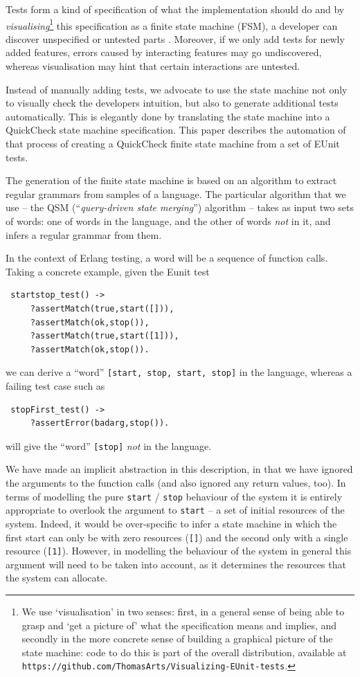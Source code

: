 \documentclass[]{sigplanconf}
\begin{document}
Tests form a kind of specification of what the implementation should do and by \emph{visualising}\footnote{We use `visualisation' in two senses: first, in a general sense of being able to grasp and `get a picture of' what the specification means and implies, and secondly in the more concrete sense of building a graphical picture of the state machine: code to do this is part of the overall distribution, available at \texttt{https://github.com/ThomasArts/Visualizing-EUnit-tests}.} this specification as a finite state machine (FSM), a developer can discover unspecified or untested parts \cite{arts2010test}. Moreover, if we only add tests for newly added features, errors caused by interacting features may go undiscovered, whereas visualisation may hint that certain interactions are untested. 

Instead of manually adding tests, we advocate to use the state machine not only to visually check the developers intuition, but also to generate additional tests automatically. This is elegantly done by translating the state machine into a QuickCheck state machine specification.
This paper describes the automation of that process of creating a QuickCheck finite state machine from a set of EUnit tests.  

The generation of the finite state machine is based on an algorithm to extract regular grammars from samples of a language. The particular algorithm that we use -- the QSM (``\emph{query-driven state merging}'') algorithm \cite{dupont2008qsm} --  takes as input two sets of words: one of words in the language, and the other of words \emph{not} in it, and infers a regular grammar from them. 

In the context of Erlang testing, a word will be a sequence of function calls. Taking a concrete example, given the Eunit test
\begin{verbatim}
 startstop_test() ->
     ?assertMatch(true,start([])),
     ?assertMatch(ok,stop()),
     ?assertMatch(true,start([1])),
     ?assertMatch(ok,stop()).
\end{verbatim}
we can derive a ``word'' \verb+[start, stop, start, stop]+ in the language, whereas a failing test case such as
\begin{verbatim}
 stopFirst_test() -> 
     ?assertError(badarg,stop()).
\end{verbatim}
will give the ``word'' \verb+[stop]+ \emph{not} in the language. 

We have made an implicit abstraction in this description, in that we have ignored the arguments to the function calls (and also ignored any return values, too). In terms of modelling the pure \texttt{start} / \texttt{stop} behaviour of the system it is entirely appropriate to overlook the argument to \texttt{start} -- a set of initial resources of the system. Indeed, it would be over-specific to infer a state machine in which the first  start can only be with zero resources (\verb+[]+) and the second only with a single resource (\verb+[1]+). However, in modelling the behaviour of the system in general this argument will need to be taken into account, as it determines the resources that the system can allocate.
\end{document}
